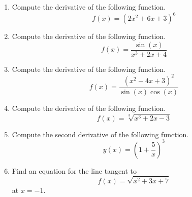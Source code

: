 \documentclass{article}
\begin{document}
\ActivityTitle[class=Calculus I, number=4, name=Differentiation II]

\begin{enumerate}
\item Compute the derivative of the following function. \[ f(x) = (2 x^2 + 6 x + 3)^{6} \]

  
\vspace{5cm}

\item Compute the derivative of the following function. \[ f(x) = \frac{\sin(x)}{x^3 + 2 x + 4} \]

  
\vspace{5cm}

\item Compute the derivative of the following function. \[ f(x) = \frac{(x^2 - 4 x + 3)^{2}}{\sin(x)\cos(x)} \]

  
\vspace{5cm}

\item Compute the derivative of the following function. \[ f(x) = \sqrt[3]{x^3 + 2 x - 3} \]

  
\vspace{5cm}

\item Compute the second derivative of the following function. \[ y(x) = \left( 1 + \frac{5}{x} \right)^{3} \]

  
\vspace{5cm}

\item Find an equation for the line tangent to \[ f(x) = \sqrt{x^2 + 3 x + 7} \] at $x = -1$.

  
\vspace{5cm}
\end{enumerate}
\end{document}
